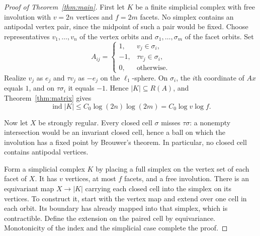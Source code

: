\documentclass[11pt]{article}
\theoremstyle{remark}
\DeclareMathOperator{\ind}{ind}
\newcommand{\Czero}{C_0}
\begin{document}
\begin{proof}[Proof of Theorem~\ref{thm:main}]
First let $K$ be a finite simplicial complex with free involution with $v=2n$ vertices
and $f=2m$ facets. No simplex contains an antipodal vertex pair, since
the midpoint of such a pair would be fixed. Choose representatives
$v_1,\ldots,v_n$ of the vertex orbits and
$\sigma_1,\ldots,\sigma_m$ of the facet orbits. Set
\[
 A_{ij}=\begin{cases}
 1,&v_j\in\sigma_i,\\
 -1,&\tau v_j\in\sigma_i,\\
 0,&\text{otherwise}.
 \end{cases}
\]
Realize $v_j$ as $e_j$ and $\tau v_j$ as $-e_j$ on the
$\ell_1$-sphere. On $\sigma_i$, the $i$th coordinate of $Ax$ equals
$1$, and on $\tau\sigma_i$ it equals $-1$. Hence
$|K|\subseteq R(A)$, and Theorem~\ref{thm:matrix} gives
\[
 \ind|K|\leq\Czero\log(2n)\log(2m)=\Czero\log v\log f.
\]

Now let $X$ be strongly regular. Every closed cell $\sigma$ misses
$\tau\sigma$: a nonempty intersection would be an invariant closed
cell, hence a ball on which the involution has a fixed point by
Brouwer's theorem. In particular, no closed cell contains antipodal
vertices.

Form a simplicial complex $K$ by placing a full simplex on the vertex
set of each facet of $X$. It has $v$ vertices, at most $f$ facets, and
a free involution. There is an equivariant map $X\to|K|$ carrying each
closed cell into the simplex on its vertices. To construct it, start
with the vertex map and extend over one cell in each orbit. Its
boundary has already mapped into that simplex, which is contractible.
Define the extension on the paired cell by equivariance.
Monotonicity of the index and the simplicial case complete the proof.
\end{proof}
\end{document}
